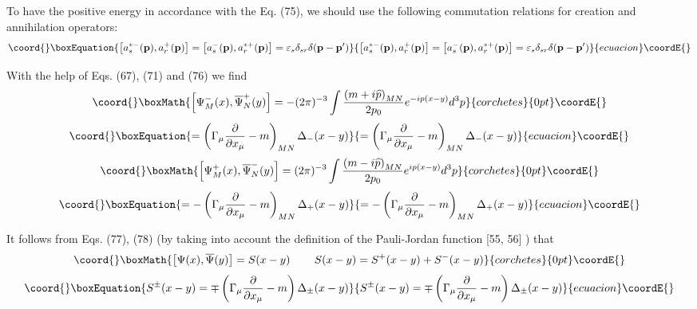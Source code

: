 \documentclass[a4paper,12pt]{article}
\begin{document}
To have the positive energy in accordance with the Eq. (75), we should use
the following commutation relations for creation and annihilation operators:
\begin{equation}\coord{}\boxEquation{
\left[ a_s^{*-}(\mathbf{p}),a_r^{+}(\mathbf{p})\right] =\left[
a_s^{-}( \mathbf{p}),a_r^{*+}(\mathbf{p})\right] =\varepsilon
_s\delta _{sr}\delta ( \mathbf{p}-\mathbf{p}^{\prime })
\label{76}
}{
\left[ a_s^{*-}(\mathbf{p}),a_r^{+}(\mathbf{p})\right] =\left[
a_s^{-}( \mathbf{p}),a_r^{*+}(\mathbf{p})\right] =\varepsilon
_s\delta _{sr}\delta ( \mathbf{p}-\mathbf{p}^{\prime })
}{ecuacion}\coordE{}\end{equation}

With the help of Eqs. (67), (71) and (76) we find
\[\coord{}\boxMath{
\left[ \Psi _M^{-}(x),\overline{\Psi }_N^{+}(y)\right] =-(2\pi )^{-3}\int
\frac{\left( m+i\widehat{p}\right) _{MN}}{2p_0}e^{-ip(x-y)}d^3p
}{corchetes}{0pt}\coordE{}\]
\begin{equation}\coord{}\boxEquation{
=\left( \Gamma _\mu \frac \partial {\partial x_\mu }-m\right) _{MN}\Delta
_{-}(x-y)  \label{77}
}{
=\left( \Gamma _\mu \frac \partial {\partial x_\mu }-m\right) _{MN}\Delta
_{-}(x-y)  }{ecuacion}\coordE{}\end{equation}
\[\coord{}\boxMath{
\left[ \Psi _M^{+}(x),\overline{\Psi }_N^{-}(y)\right] =(2\pi )^{-3}\int
\frac{\left( m-i\widehat{p}\right) _{MN}}{2p_0}e^{ip(x-y)}d^3p
}{corchetes}{0pt}\coordE{}\]
\begin{equation}\coord{}\boxEquation{
=-\left( \Gamma _\mu \frac \partial {\partial x_\mu }-m\right) _{MN}\Delta
_{+}(x-y)  \label{78}
}{
=-\left( \Gamma _\mu \frac \partial {\partial x_\mu }-m\right) _{MN}\Delta
_{+}(x-y)  }{ecuacion}\coordE{}\end{equation}

It follows from Eqs. (77), (78) (by taking into account the definition of
the Pauli-Jordan function [55, 56] \coordHE{}) that
\[\coord{}\boxMath{
\left[ \Psi (x),\overline{\Psi }(y)\right] =S(x-y)\hspace{0.3in}
S(x-y)=S^{+}(x-y)+S^{-}(x-y)
}{corchetes}{0pt}\coordE{}\]
\begin{equation}\coord{}\boxEquation{
S^{\pm }(x-y)=\mp \left( \Gamma _\mu \frac \partial {\partial x_\mu
}-m\right) \Delta _{\pm }(x-y)  \label{79}
}{
S^{\pm }(x-y)=\mp \left( \Gamma _\mu \frac \partial {\partial x_\mu
}-m\right) \Delta _{\pm }(x-y)  }{ecuacion}\coordE{}\end{equation}
\end{document}
